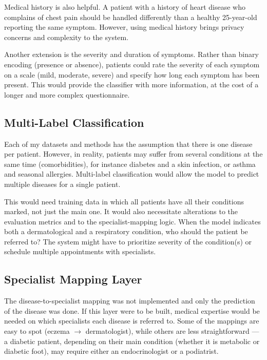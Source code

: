 Medical history is also helpful. A patient with a history of heart disease who complains of chest pain should be handled differently than a healthy 25-year-old reporting the same symptom. However, using medical history brings privacy concerns and complexity to the system.

Another extension is the severity and duration of symptoms. Rather than binary encoding (presence or absence), patients could rate the severity of each symptom on a scale (mild, moderate, severe) and specify how long each symptom has been present. This would provide the classifier with more information, at the cost of a longer and more complex questionnaire.

\subsection{Multi-Label Classification}

Each of my datasets and methods has the assumption that there is one disease per patient. However, in reality, patients may suffer from several conditions at the same time (comorbidities), for instance diabetes and a skin infection, or asthma and seasonal allergies. Multi-label classification would allow the model to predict multiple diseases for a single patient.

This would need training data in which all patients have all their conditions marked, not just the main one. It would also necessitate alterations to the evaluation metrics and to the specialist-mapping logic. When the model indicates both a dermatological and a respiratory condition, who should the patient be referred to? The system might have to prioritize severity of the condition(s) or schedule multiple appointments with specialists.

\subsection{Specialist Mapping Layer}

The disease-to-specialist mapping was not implemented and only the prediction of the disease was done. If this layer were to be built, medical expertise would be needed on which specialists each disease is referred to. Some of the mappings are easy to spot (eczema $\rightarrow$ dermatologist), while others are less straightforward --- a diabetic patient, depending on their main condition (whether it is metabolic or diabetic foot), may require either an endocrinologist or a podiatrist.

